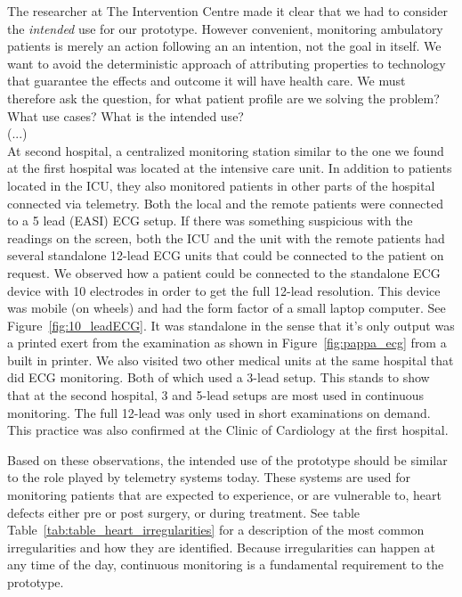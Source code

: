 The researcher at The Intervention Centre made it clear that we had to consider the \textit{intended} use for our prototype. However convenient, monitoring ambulatory patients is merely an action following an an intention, not the goal in itself. We want to avoid the deterministic approach of attributing properties to technology that guarantee the effects and outcome it will have health care. We must therefore ask the question, for what patient profile are we solving the problem? What use cases? What is the intended use?
\\
\newline
(...)
\\
\newline
At second hospital, a centralized monitoring station similar to the one we found at the first hospital was located at the intensive care unit. In addition to patients located in the ICU, they also monitored patients in other parts of the hospital connected via telemetry. Both the local and the remote patients were connected to a 5 lead (EASI) ECG setup. If there was something suspicious with the readings on the screen, both the ICU and the unit with the remote patients had several standalone 12-lead ECG units that could be connected to the patient on request. We observed how a patient could be connected to the standalone ECG device with 10 electrodes in order to get the full 12-lead resolution. This device was mobile (on wheels) and had the form factor of a small laptop computer. See Figure~\ref{fig:10_leadECG}. It was standalone in the sense that it's only output was a printed exert from the examination as shown in Figure~\ref{fig:pappa_ecg} from a built in printer. We also visited two other medical units at the same hospital that did ECG monitoring. Both of which used a 3-lead setup. This stands to show that at the second hospital, 3 and 5-lead setups are most used in continuous monitoring. The full 12-lead was only used in short examinations on demand. This practice was also confirmed at the Clinic of Cardiology at the first hospital.


Based on these observations, the intended use of the prototype should be similar to the role played by telemetry systems today. These systems are used for monitoring patients that are expected to experience, or are vulnerable to, heart defects either pre or post surgery, or during treatment. See table Table~\ref{tab:table_heart_irregularities} for a description of the most common irregularities and how they are identified. Because irregularities can happen at any time of the day, continuous monitoring is a fundamental requirement to the prototype.

